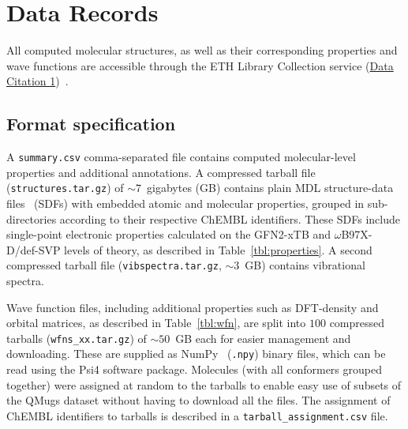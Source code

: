 \section*{Data Records}

All computed molecular structures, as well as their corresponding properties and wave functions are accessible through the ETH Library Collection service (\href{https://doi.org/10.3929/ethz-b-000482129}{Data Citation 1})~\cite{qmugs_repository}.

\subsection*{Format specification}
A \texttt{summary.csv} comma-separated file contains computed molecular-level properties and additional annotations. A compressed tarball file (\texttt{structures.tar.gz}) of $\sim7$~gigabytes (GB) contains plain MDL structure-data files~\cite{dalby1992description} (SDFs) with embedded atomic and molecular properties, grouped in sub-directories according to their respective ChEMBL identifiers. These SDFs include single-point electronic properties calculated on the GFN2-xTB and $\omega$B97X-D/def-SVP levels of theory, as described in Table~\ref{tbl:properties}. A second compressed tarball file (\texttt{vibspectra.tar.gz}, $\sim3$~GB) contains vibrational spectra.

Wave function files, including additional properties such as DFT-density and orbital matrices, as described in Table~\ref{tbl:wfn}, are split into $100$ compressed tarballs (\texttt{wfns\_xx.tar.gz}) of $\sim50$~GB each for easier management and downloading. These are supplied as NumPy~\cite{harris2020array} (\texttt{.npy}) binary files, which can be read using the Psi4 software package. Molecules (with all conformers grouped together) were assigned at random to the tarballs to enable easy use of subsets of the QMugs dataset without having to download all the files. The assignment of ChEMBL identifiers to tarballs is described in a \texttt{tarball\_assignment.csv} file.


